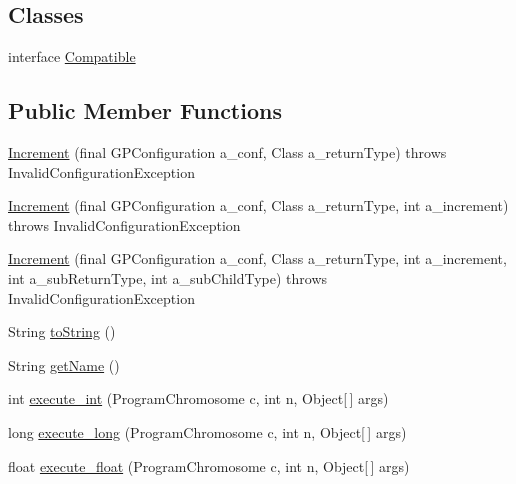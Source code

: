 \subsection*{Classes}
\begin{DoxyCompactItemize}
\item 
interface \hyperlink{interfaceorg_1_1jgap_1_1gp_1_1function_1_1_increment_1_1_compatible}{Compatible}
\end{DoxyCompactItemize}
\subsection*{Public Member Functions}
\begin{DoxyCompactItemize}
\item 
\hyperlink{classorg_1_1jgap_1_1gp_1_1function_1_1_increment_a9eb4845573417a758e13d61e1892cddf}{Increment} (final G\-P\-Configuration a\-\_\-conf, Class a\-\_\-return\-Type)  throws Invalid\-Configuration\-Exception 
\item 
\hyperlink{classorg_1_1jgap_1_1gp_1_1function_1_1_increment_a33567f818522fc459471b25ff8ab1026}{Increment} (final G\-P\-Configuration a\-\_\-conf, Class a\-\_\-return\-Type, int a\-\_\-increment)  throws Invalid\-Configuration\-Exception 
\item 
\hyperlink{classorg_1_1jgap_1_1gp_1_1function_1_1_increment_a461106d46e8b738cd6214c8c4da9ce84}{Increment} (final G\-P\-Configuration a\-\_\-conf, Class a\-\_\-return\-Type, int a\-\_\-increment, int a\-\_\-sub\-Return\-Type, int a\-\_\-sub\-Child\-Type)  throws Invalid\-Configuration\-Exception 
\item 
String \hyperlink{classorg_1_1jgap_1_1gp_1_1function_1_1_increment_ac82f1520a427e02e1d001d863484dc7f}{to\-String} ()
\item 
String \hyperlink{classorg_1_1jgap_1_1gp_1_1function_1_1_increment_a5bfd4bd8da2e18ff4a5fd418eda60cb4}{get\-Name} ()
\item 
int \hyperlink{classorg_1_1jgap_1_1gp_1_1function_1_1_increment_adec880988e2ae179ebb705c8ce7bec54}{execute\-\_\-int} (Program\-Chromosome c, int n, Object\mbox{[}$\,$\mbox{]} args)
\item 
long \hyperlink{classorg_1_1jgap_1_1gp_1_1function_1_1_increment_acdf58fa03527a5474a5e32bd7818ab66}{execute\-\_\-long} (Program\-Chromosome c, int n, Object\mbox{[}$\,$\mbox{]} args)
\item 
float \hyperlink{classorg_1_1jgap_1_1gp_1_1function_1_1_increment_a7bb74f6515d14c7b77053e6f880954cb}{execute\-\_\-float} (Program\-Chromosome c, int n, Object\mbox{[}$\,$\mbox{]} args)

\end{DoxyCompactItemize}
